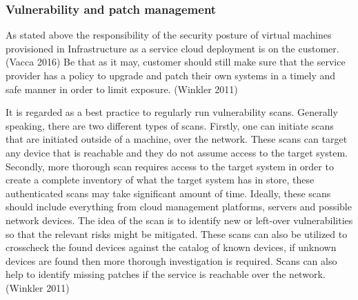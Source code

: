 \documentclass{article}
\begin{document}
\subsubsection{Vulnerability and patch management}
As stated above the responsibility of the security posture of virtual machines provisioned in Infrastructure as a service cloud deployment is on the customer. (Vacca 2016) Be that as it may, customer should still make sure that the service provider has a policy to upgrade and patch their own systems in a timely and safe manner in order to limit exposure. (Winkler 2011)
\par
It is regarded as a best practice to regularly run vulnerability scans. Generally speaking, there are two different types of scans. Firstly, one can initiate scans that are initiated outside of a machine, over the network. These scans can target any device that is reachable and they do not assume access to the target system. Secondly, more thorough scan requires access to the target system in order to create a complete inventory of what the target system has in store, these authenticated scans may take significant amount of time. Ideally, these scans should include everything from cloud management platforms, servers and possible network devices. The idea of the scan is to identify new or left-over vulnerabilities so that the relevant risks might be mitigated. These scans can also be utilized to crosscheck the found devices against the catalog of known devices, if unknown devices are found then more thorough investigation is required. Scans can also help to identify missing patches if the service is reachable over the network. (Winkler 2011)
\end{document}
